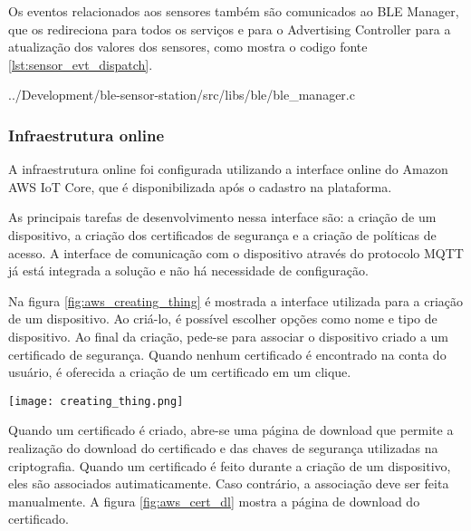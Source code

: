 Os eventos relacionados aos sensores também são comunicados ao BLE Manager, que
os redireciona para todos os serviços e para o Advertising Controller para a
atualização dos valores dos sensores, como mostra o codigo fonte
\ref{lst:sensor_evt_dispatch}.

\begin{minipage}{0.95\linewidth} 
 {../Development/ble-sensor-station/src/libs/ble/ble_manager.c}
\end{minipage}




\subsubsection{Infraestrutura online}

A infraestrutura online foi configurada utilizando a interface online do Amazon
AWS IoT Core, que é disponibilizada após o cadastro na plataforma.

As principais tarefas de desenvolvimento nessa interface são: a criação de um
dispositivo, a criação dos certificados de segurança e a criação de políticas de
acesso. A interface de comunicação com o dispositivo através do protocolo MQTT
já está integrada a solução e não há necessidade de configuração.

Na figura \ref{fig:aws_creating_thing} é mostrada a interface utilizada para a
criação de um dispositivo. Ao criá-lo, é possível escolher opções como nome
e tipo de dispositivo. Ao final da criação, pede-se para associar o dispositivo
criado a um certificado de segurança. Quando nenhum certificado é encontrado na
conta do usuário, é oferecida a criação de um certificado em um clique.

\begin{center}
	\centering 
	\texttt{[image: creating\_thing.png]}
	\label{fig:aws_creating_thing}
\end{center} 

Quando um certificado é criado, abre-se uma página de download que permite a
realização do download do certificado e das chaves de segurança utilizadas na
criptografia. Quando um certificado é feito durante a criação de um dispositivo,
eles são associados autimaticamente. Caso contrário, a associação deve ser feita
manualmente. A figura \ref{fig:aws_cert_dl} mostra a página de download do
certificado.

